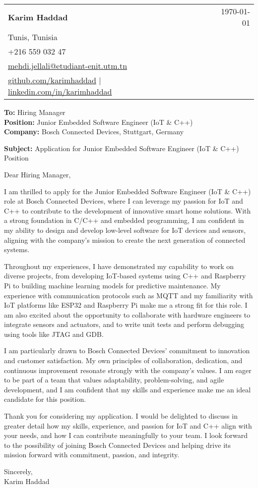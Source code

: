 \documentclass[letterpaper,11pt]{article}
\makeatletter
\newcommand{\letterHeading}[5]{
    \begin{tabular*}{\textwidth}{l@{\extracolsep{\fill}}r}
    \textbf{\Large #1} & #5 \\  %
    #2 & \\
    #3 & \\
    #4 & \\
    \end{tabular*}
    \vspace{15pt}
}
\newcommand{\letterRecipient}[3]{
    \textbf{\large To:} #1 \\
    \textbf{\large Position:} #2 \\
    \textbf{\large Company:} #3 \\
    \vspace{12pt}
}
\newcommand{\letterSubject}[1]{
    \textbf{\large Subject:} #1 \\
    \vspace{15pt}
}
\makeatother
\begin{document}
    \letterHeading
    {Karim Haddad}
    {Tunis, Tunisia}
    {+216 559 032 47 \\ \href{mailto:mehdi.jellali@etudiant-enit.utm.tn}{mehdi.jellali@etudiant-enit.utm.tn}}
    {\href{https://github.com/karimhaddad}{github.com/karimhaddad} $|$ \href{https://www.linkedin.com/in/karimhaddad}{linkedin.com/in/karimhaddad}}
    {\today}

    \letterRecipient
    {Hiring Manager}
    {Junior Embedded Software Engineer (IoT & C++)}
    {Bosch Connected Devices, Stuttgart, Germany}

    \letterSubject{Application for Junior Embedded Software Engineer (IoT & C++) Position}

    Dear Hiring Manager,

    I am thrilled to apply for the Junior Embedded Software Engineer (IoT & C++) role at Bosch Connected Devices, where I can leverage my passion for IoT and C++ to contribute to the development of innovative smart home solutions. With a strong foundation in C/C++ and embedded programming, I am confident in my ability to design and develop low-level software for IoT devices and sensors, aligning with the company's mission to create the next generation of connected systems.

    Throughout my experiences, I have demonstrated my capability to work on diverse projects, from developing IoT-based systems using C++ and Raspberry Pi to building machine learning models for predictive maintenance. My experience with communication protocols such as MQTT and my familiarity with IoT platforms like ESP32 and Raspberry Pi make me a strong fit for this role. I am also excited about the opportunity to collaborate with hardware engineers to integrate sensors and actuators, and to write unit tests and perform debugging using tools like JTAG and GDB.

    I am particularly drawn to Bosch Connected Devices' commitment to innovation and customer satisfaction. My own principles of collaboration, dedication, and continuous improvement resonate strongly with the company's values. I am eager to be part of a team that values adaptability, problem-solving, and agile development, and I am confident that my skills and experience make me an ideal candidate for this position.

    Thank you for considering my application. I would be delighted to discuss in greater detail how my skills, experience, and passion for IoT and C++ align with your needs, and how I can contribute meaningfully to your team. I look forward to the possibility of joining Bosch Connected Devices and helping drive its mission forward with commitment, passion, and integrity.

    Sincerely,\\[12pt]

    Karim Haddad
\end{document}
